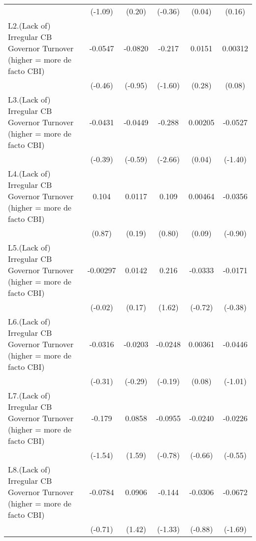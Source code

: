 {\begin{longtable}{l*{5}{c}}
                &  (-1.09)         &   (0.20)         &  (-0.36)         &   (0.04)         &   (0.16)         \\
[1em]
L2.(Lack of) Irregular CB Governor Turnover (higher = more de facto CBI)&  -0.0547         &  -0.0820         &   -0.217         &   0.0151         &  0.00312         \\
                &  (-0.46)         &  (-0.95)         &  (-1.60)         &   (0.28)         &   (0.08)         \\
[1em]
L3.(Lack of) Irregular CB Governor Turnover (higher = more de facto CBI)&  -0.0431         &  -0.0449         &   -0.288\sym{**} &  0.00205         &  -0.0527         \\
                &  (-0.39)         &  (-0.59)         &  (-2.66)         &   (0.04)         &  (-1.40)         \\
[1em]
L4.(Lack of) Irregular CB Governor Turnover (higher = more de facto CBI)&    0.104         &   0.0117         &    0.109         &  0.00464         &  -0.0356         \\
                &   (0.87)         &   (0.19)         &   (0.80)         &   (0.09)         &  (-0.90)         \\
[1em]
L5.(Lack of) Irregular CB Governor Turnover (higher = more de facto CBI)& -0.00297         &   0.0142         &    0.216         &  -0.0333         &  -0.0171         \\
                &  (-0.02)         &   (0.17)         &   (1.62)         &  (-0.72)         &  (-0.38)         \\
[1em]
L6.(Lack of) Irregular CB Governor Turnover (higher = more de facto CBI)&  -0.0316         &  -0.0203         &  -0.0248         &  0.00361         &  -0.0446         \\
                &  (-0.31)         &  (-0.29)         &  (-0.19)         &   (0.08)         &  (-1.01)         \\
[1em]
L7.(Lack of) Irregular CB Governor Turnover (higher = more de facto CBI)&   -0.179         &   0.0858         &  -0.0955         &  -0.0240         &  -0.0226         \\
                &  (-1.54)         &   (1.59)         &  (-0.78)         &  (-0.66)         &  (-0.55)         \\
[1em]
L8.(Lack of) Irregular CB Governor Turnover (higher = more de facto CBI)&  -0.0784         &   0.0906         &   -0.144         &  -0.0306         &  -0.0672         \\
                &  (-0.71)         &   (1.42)         &  (-1.33)         &  (-0.88)         &  (-1.69)         \\

\end{longtable}}

